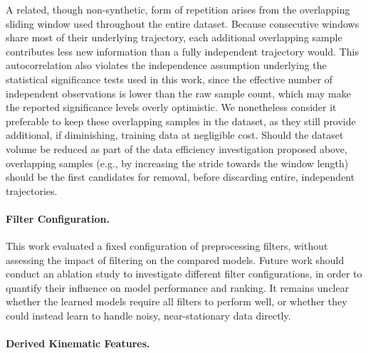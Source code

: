 A related, though non-synthetic, form of repetition arises from the overlapping sliding window used throughout the entire dataset. Because consecutive windows share most of their underlying trajectory, each additional overlapping sample contributes less new information than a fully independent trajectory would. This autocorrelation also violates the independence assumption underlying the statistical significance tests used in this work, since the effective number of independent observations is lower than the raw sample count, which may make the reported significance levels overly optimistic. We nonetheless consider it preferable to keep these overlapping samples in the dataset, as they still provide additional, if diminishing, training data at negligible cost. Should the dataset volume be reduced as part of the data efficiency investigation proposed above, overlapping samples (e.g., by increasing the stride towards the window length) should be the first candidates for removal, before discarding entire, independent trajectories.


\paragraph{Filter Configuration.}
This work evaluated a fixed configuration of preprocessing filters, without assessing the impact of filtering on the compared models.
Future work should conduct an ablation study to investigate different filter configurations, in order to quantify their influence on model performance and ranking.
It remains unclear whether the learned models require all filters to perform well, or whether they could instead learn to handle noisy, near-stationary data directly.

\paragraph{Derived Kinematic Features.}
\label{subsubsec:kinematiclowvel}

